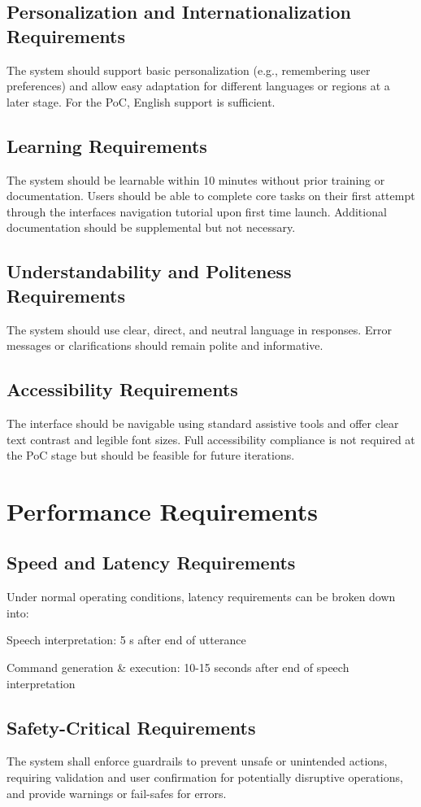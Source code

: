 \documentclass[11pt]{article}
\begin{document}
\subsection{Personalization and Internationalization Requirements}
The system should support basic personalization (e.g., remembering user preferences) and allow easy adaptation for different languages or regions at a later stage. For the PoC, English support is sufficient.
\subsection{Learning Requirements}
The system should be learnable within 10 minutes without prior training or documentation. Users should be able to complete core tasks on their first attempt through the interfaces navigation tutorial upon first time launch. Additional documentation should be supplemental but not necessary. 
\subsection{Understandability and Politeness Requirements}
The system should use clear, direct, and neutral language in responses. Error messages or clarifications should remain polite and informative.
\subsection{Accessibility Requirements}
The interface should be navigable using standard assistive tools and offer clear text contrast and legible font sizes. Full accessibility compliance is not required at the PoC stage but should be feasible for future iterations.

\section{Performance Requirements}
\subsection{Speed and Latency Requirements}
Under normal operating conditions, latency requirements can be broken down into:

Speech interpretation: 5 s after end of utterance

Command generation \& execution: 10-15 seconds after end of speech interpretation
\subsection{Safety-Critical Requirements}
The system shall enforce guardrails to prevent unsafe or unintended actions, requiring validation and user confirmation for potentially disruptive operations, and provide warnings or fail-safes for errors.
\end{document}
